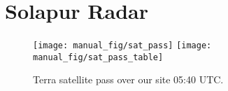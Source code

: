 \documentclass[10pt,usletter]{article} %
\begin{document}
\section{Solapur Radar}
\begin{figure}[H]
\centering
\texttt{[image: manual\_fig/sat\_pass]}
\texttt{[image: manual\_fig/sat\_pass\_table]}
\caption{Terra satellite pass over our site 05:40 UTC.}
\end{figure}






\end{document}
